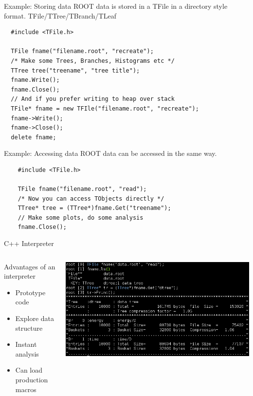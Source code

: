 \documentclass[xcolor=svgnames]{beamer}
\begin{document}
\begin{frame}[fragile]{Example: Storing data}
ROOT data is stored in a TFile in a directory style format. TFile/TTree/TBranch/TLeaf
\begin{lstlisting}
  #include <TFile.h>
  
  TFile fname("filename.root", "recreate");
  /* Make some Trees, Branches, Histograms etc */
  TTree tree("treename", "tree title");  
  fname.Write();
  fname.Close();
  // And if you prefer writing to heap over stack
  TFile* fname = new TFIle("filename.root", "recreate");
  fname->Write();
  fname->Close();
  delete fname;
\end{lstlisting}
\end{frame}

\begin{frame}[fragile]{Example: Accessing data}
  ROOT data can be accessed in the same way.
  \begin{lstlisting}
    #include <TFile.h>
    
    TFile fname("filename.root", "read");
    /* Now you can access TObjects directly */
    TTree* tree = (TTree*)fname.Get("treename");
    // Make some plots, do some analysis
    fname.Close();
  \end{lstlisting}
\end{frame}

\begin{frame}{C++ Interpreter}
  \begin{columns}
    \begin{column}{0.35\textwidth}
      Advantages of an interpreter
      \begin{itemize}
      \item Prototype code
      \item Explore data structure
      \item Instant analysis
      \item Can load production macros
      \end{itemize}
    \end{column}
    \begin{column}{0.65\textwidth}
      \includegraphics[width=\textwidth]{images/open_tfile.png}
    \end{column}
  \end{columns}
\end{frame}
\end{document}
